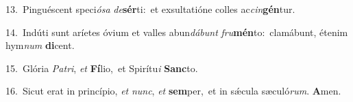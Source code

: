 {\numbfont\textcolor{\numbcolor}{13.}}~Pinguéscent speci\-\textit{ó}\-\textit{sa} \textit{de}\-\textbf{sér}ti:~\star et exsultatióne colles ac\-\textit{cin}\-\textbf{gén}tur.\par
{\numbfont\textcolor{\numbcolor}{14.}}~Indúti sunt aríetes óvium et valles abun\-\textit{dá}\-\textit{bunt} \textit{fru}\-\textbf{mén}to:~\star clamábunt, étenim hym\textit{num} \textbf{di}\-cent.\par
{\numbfont\textcolor{\numbcolor}{15.}}~Glória \textit{Pa}\-\textit{tri}, \textit{et} \textbf{Fí}\-lio,~\star et Spirítu\textit{i} \textbf{Sanc}\-to.\par
{\numbfont\textcolor{\numbcolor}{16.}}~Sicut erat in princípio, \textit{et} \textit{nunc}\-, \textit{et} \textbf{sem}\-per,~\star et in sǽcula sæculó\-\textit{rum}\-. \textbf{A}\-men.\par
